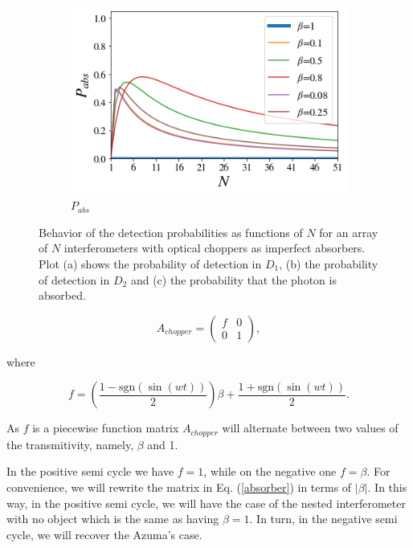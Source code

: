 \documentclass[12pt]{book}
\begin{document}
\begin{figure}[!t]
\begin{subfigure}[b]{0.45\linewidth}
\includegraphics[width=\linewidth]{images/Chopper_abs.png}
\caption{$P_{abs}$}
\label{fig:BS1}
\end{subfigure}
\caption{Behavior of the detection probabilities as functions of $N$ for an array of $N$ interferometers with optical choppers as imperfect absorbers. Plot (a) shows the probability of detection in $D_{1}$, (b) the probability of detection in $D_{2}$ and (c) the probability that the photon is absorbed.}
\label{fig:several_chpper}
\end{figure}

\begin{equation}
A_{chopper}=\begin{pmatrix} f & 0 \\ 0 & 1 \end{pmatrix},
\end{equation}

where

\begin{equation}
f=\left(\frac{1-\mathrm{sgn}(\sin(wt))}{2} \right)\beta+\frac{1+\mathrm{sgn}(\sin(wt))}{2}.
\end{equation}

As $f$ is a piecewise function matrix $A_{chopper}$ will alternate between two values of the transmitivity, namely, $\beta$ and 1.



In the positive semi cycle we have $f=1$, while on the negative one $f=\beta$. For convenience, we will rewrite the matrix in Eq. (\ref{absorber}) in terms of $|\beta|$. In this way, in the positive semi cycle, we will have the case of the nested interferometer with no object which is the same as having $\beta=1$. In turn, in the negative semi cycle, we will recover the Azuma's case.
\end{document}
